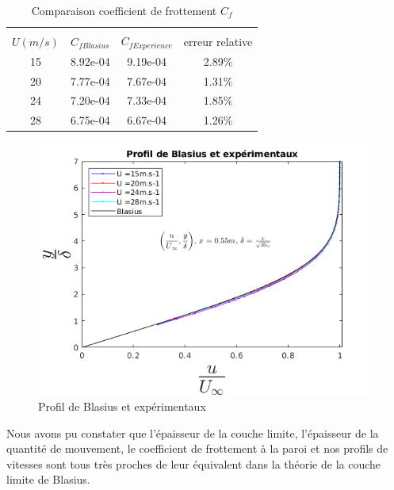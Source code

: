 \begin{table}[ht]
	\centering
	\begin{tabular}{cccc}
		\hline\\
		$U(m/s)$ & $C_{fBlasius}$ &
		$ C_{fExperience}$ & 
		 erreur relative\\
		\hline
   15 & 8.92e-04   & 9.19e-04   & 2.89\%\\
   20 & 7.77e-04   & 7.67e-04   & 1.31\%\\
   24 & 7.20e-04   & 7.33e-04   & 1.85\%\\
   28 & 6.75e-04   & 6.67e-04   & 1.26\%
	\end{tabular}
	\caption{Comparaison coefficient de frottement $C_{f}$}
\end{table}
\begin{figure}[ht]
	\centering
	\includegraphics[scale = 0.6]{./gfx/Bla.png}
	\caption{Profil de Blasius et expérimentaux}
\end{figure}
\newpage
Nous avons pu constater que l'épaisseur de la couche limite, l'épaisseur de la quantité de mouvement, le coefficient de frottement à la paroi et nos profils de vitesses sont tous très proches de leur équivalent dans la théorie de la couche limite de Blasius.
